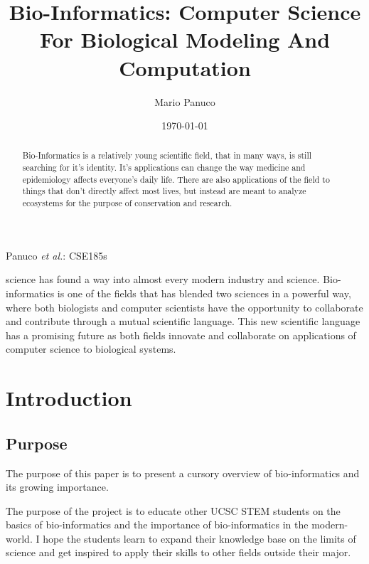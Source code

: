 \documentclass[12pt,journal,compsoc]{IEEEtran}
\begin{document}
\title{Bio-Informatics: Computer Science For Biological Modeling And Computation}

\author{Mario Panuco}


\date{\today}        %

%
{Panuco \MakeLowercase{\textit{et al.}}: CSE185s}




\maketitle


\begin{abstract}
Bio-Informatics is a relatively young scientific field, that in many ways, is still searching for it's identity. It's applications can change the way medicine and epidemiology affects everyone's daily life. There are also applications of the field to things that don't directly affect most lives, but instead are meant to analyze ecosystems for the purpose of conservation and research. 

\end{abstract}
 science has found a way into almost every modern industry and science. Bio-informatics is one of the fields that has blended two sciences in a powerful way, where both biologists and computer scientists have the opportunity to collaborate and contribute through a mutual scientific language. This new scientific language has a promising future as both fields innovate and collaborate on applications of computer science to biological systems.  
\section{Introduction}

\subsection{Purpose}
The purpose of this paper is to present a cursory overview of bio-informatics and its growing importance.

The purpose of the project is to educate other UCSC STEM students on the basics of bio-informatics and the importance of bio-informatics in the modern-world. I hope the students learn to expand their knowledge base on the limits of science and get inspired to apply their skills to other fields outside their major.
\end{document}
